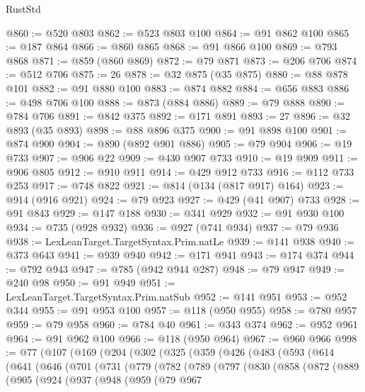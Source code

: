 \begin{lexlean}{RustStd}
\begin{coremodule}
@860 := @520 @803
@862 := @523 @803 @100
@864 := @91 @862 @100
@865 := @187 @864
@866 := @860 @865
@868 := @91 @866 @100
@869 := @793 @868
@871 := @859 (@860 @869)
@872 := @79 @871
@873 := @206 @706
@874 := @512 @706
@875 := 26
@878 := @32 @875 (@35 @875)
@880 := @88 @878 @101
@882 := @91 @880 @100
@883 := @874 @882
@884 := @656 @883
@886 := @498 @706 @100
@888 := @873 (@884 @886)
@889 := @79 @888
@890 := @784 @706
@891 := @842 @375
@892 := @171 @891
@893 := 27
@896 := @32 @893 (@35 @893)
@898 := @88 @896 @375
@900 := @91 @898 @100
@901 := @874 @900
@904 := @890 (@892 @901 @886)
@905 := @79 @904
@906 := @19 @733
@907 := @906 @22
@909 := @430 @907 @733
@910 := @19 @909
@911 := @906 @805
@912 := @910 @911
@914 := @429 @912 @733
@916 := @112 @733 @253
@917 := @748 @822
@921 := @814 (@134 (@817 @917) @164)
@923 := @914 (@916 @921)
@924 := @79 @923
@927 := @429 (@41 @907) @733
@928 := @91 @843
@929 := @147 @188
@930 := @341 @929
@932 := @91 @930 @100
@934 := @735 (@928 @932)
@936 := @927 (@741 @934)
@937 := @79 @936
@938 := LexLeanTarget.TargetSyntax.Prim.natLe
@939 := @141 @938
@940 := @373 @643
@941 := @939 @940
@942 := @171 @941
@943 := @174 @374
@944 := @792 @943
@947 := @785 (@942 @944 @287)
@948 := @79 @947
@949 := @240 @98
@950 := @91 @949
@951 := LexLeanTarget.TargetSyntax.Prim.natSub
@952 := @141 @951
@953 := @952 @344
@955 := @91 @953 @100
@957 := @118 (@950 @955)
@958 := @780 @957
@959 := @79 @958
@960 := @784 @40
@961 := @343 @374
@962 := @952 @961
@964 := @91 @962 @100
@966 := @118 (@950 @964)
@967 := @960 @966
@998 := @77
    (@107
      (@169
        (@204
          (@302
            (@325
              (@359
                (@426
                  (@483
                    (@593
                      (@614
                        (@641
                          (@646
                            (@701
                              (@731
                                (@779
                                  (@782
                                    (@789
                                      (@797
                                        (@830
                                          (@858
                                            (@872
                                              (@889
                                                (@905
                                                  (@924
                                                    (@937
                                                      (@948
                                                        (@959
                                                          (@79
                                                            @967

\end{coremodule}
\end{lexlean}
